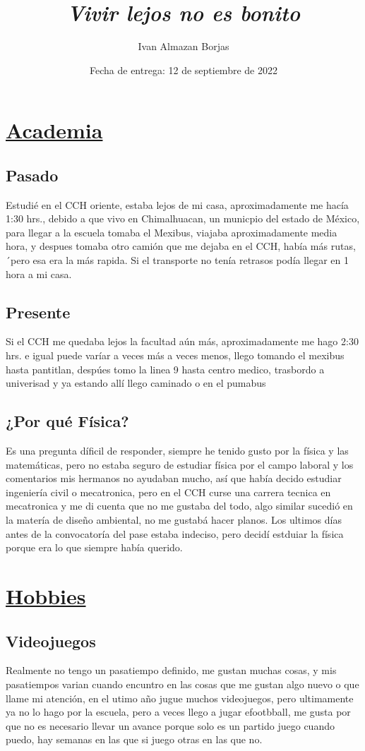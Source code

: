 \documentclass[letterpaper,12pt]{article}
\title{\huge{\emph{Vivir lejos no es bonito}}}
\author{Ivan Almazan Borjas}
\date{Fecha de entrega: 12 de septiembre de 2022}
\begin{document}
\maketitle

\section{\underline{\huge{Academia}}}
      \subsection{\huge{}{Pasado}}
      {\tiny Estudié en el CCH oriente, estaba lejos de mi casa, aproximadamente me hacía 1:30 hrs., debido a que vivo en Chimalhuacan, un municpio del estado de México, para llegar a la escuela tomaba el Mexibus, viajaba aproximadamente media hora, y despues tomaba otro camión que me dejaba en el CCH, había más rutas, ´pero esa era la más rapida. Si el transporte no tenía retrasos podía llegar en 1 hora a mi casa.}
      \subsection{\huge{Presente}}
      {\large Si el CCH me quedaba lejos la facultad aún más, aproximadamente me hago 2:30 hrs. e igual puede varíar a veces más a veces menos, llego tomando el mexibus hasta pantitlan, despúes tomo la linea 9 hasta centro medico, trasbordo a univerisad y ya estando allí llego caminado o en el pumabus}
      \subsection{\huge{¿Por qué Física?}}
      Es una pregunta díficil de responder, siempre he tenido gusto por la física y las matemáticas, pero no estaba seguro de estudiar física por el campo laboral y los comentarios mis hermanos no ayudaban mucho, así que había decido estudiar ingeniería civil o mecatronica, pero en el CCH curse una carrera tecnica en mecatronica y me di cuenta que no me gustaba del todo, algo similar sucedió en la matería de diseño ambiental, no me gustabá hacer planos. Los ultimos días antes de la convocatoría del pase  estaba indeciso, pero decidí estduiar la física porque era lo que siempre había querido.
\section{\underline{\huge{Hobbies}}}
      \subsection{\huge{Videojuegos}}
      {\tiny Realmente no tengo un pasatiempo definido, me gustan muchas cosas, y mis pasatiempos varian cuando encuntro en las cosas que me gustan algo nuevo o que llame mi atención, en el utimo año jugue muchos videojuegos, pero ultimamente ya no lo hago por la escuela, pero a veces llego a jugar efootbball, me gusta por que no es necesario llevar un avance porque solo es un partido juego cuando puedo, hay semanas en las que si juego otras en las que no.}
\end{document}
